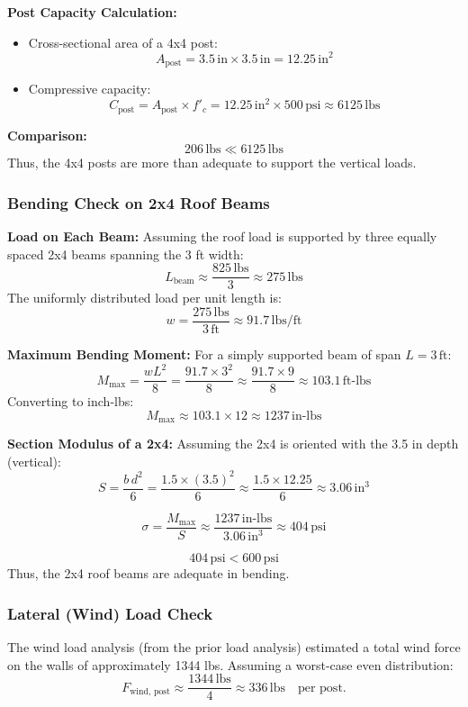 \documentclass[12pt]{report}
\begin{document}
\noindent\textbf{Post Capacity Calculation:}
\begin{itemize}
    \item Cross-sectional area of a 4x4 post:
    \[
    A_{\text{post}} = 3.5\,\text{in} \times 3.5\,\text{in} = 12.25\,\text{in}^2
    \]
    \item Compressive capacity:
    \[
    C_{\text{post}} = A_{\text{post}} \times f'_c = 12.25\,\text{in}^2 \times 500\,\text{psi} \approx 6125\,\text{lbs}
    \]
\end{itemize}
\textbf{Comparison:}
\[
206\,\text{lbs} \ll 6125\,\text{lbs}
\]
Thus, the 4x4 posts are more than adequate to support the vertical loads.

\subsubsection{Bending Check on 2x4 Roof Beams}
\textbf{Load on Each Beam:}  
Assuming the roof load is supported by three equally spaced 2x4 beams spanning the 3 ft width:
\[
L_{\text{beam}} \approx \frac{825\,\text{lbs}}{3} \approx 275\,\text{lbs}
\]
The uniformly distributed load per unit length is:
\[
w = \frac{275\,\text{lbs}}{3\,\text{ft}} \approx 91.7\,\text{lbs/ft}
\]

\noindent\textbf{Maximum Bending Moment:}
For a simply supported beam of span \(L = 3\,\text{ft}\):
\[
M_{\text{max}} = \frac{w L^2}{8} = \frac{91.7 \times 3^2}{8} \approx \frac{91.7 \times 9}{8} \approx 103.1\,\text{ft-lbs}
\]
Converting to inch-lbs:
\[
M_{\text{max}} \approx 103.1 \times 12 \approx 1237\,\text{in-lbs}
\]

\noindent\textbf{Section Modulus of a 2x4:}  
Assuming the 2x4 is oriented with the 3.5 in depth (vertical):
\[
S = \frac{b \, d^2}{6} = \frac{1.5 \times (3.5)^2}{6} \approx \frac{1.5 \times 12.25}{6} \approx 3.06\,\text{in}^3
\]

\[
\sigma = \frac{M_{\text{max}}}{S} \approx \frac{1237\,\text{in-lbs}}{3.06\,\text{in}^3} \approx 404\,\text{psi}
\]

\[
404\,\text{psi} < 600\,\text{psi}
\]
Thus, the 2x4 roof beams are adequate in bending.

\subsubsection{Lateral (Wind) Load Check}
The wind load analysis (from the prior load analysis) estimated a total wind force on the walls of approximately 1344 lbs. Assuming a worst-case even distribution:
\[
F_{\text{wind, post}} \approx \frac{1344\,\text{lbs}}{4} \approx 336\,\text{lbs} \quad \text{per post.}
\]
\end{document}
